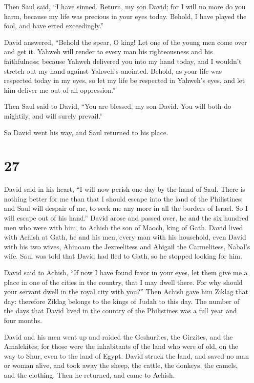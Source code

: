  Then Saul said, ``I have sinned. Return, my son David; for
I will no more do you harm, because my life was precious in your eyes
today. Behold, I have played the fool, and have erred exceedingly.''

 David answered, ``Behold the spear, O king! Let one of the
young men come over and get it.  Yahweh will render to
every man his righteousness and his faithfulness; because Yahweh
delivered you into my hand today, and I wouldn't stretch out my hand
against Yahweh's anointed.  Behold, as your life was
respected today in my eyes, so let my life be respected in Yahweh's
eyes, and let him deliver me out of all oppression.''

 Then Saul said to David, ``You are blessed, my son David.
You will both do mightily, and will surely prevail.''

So David went his way, and Saul returned to his place.

\hypertarget{section-26}{%
\section{27}\label{section-26}}

 David said in his heart, ``I will now perish one day by the
hand of Saul. There is nothing better for me than that I should escape
into the land of the Philistines; and Saul will despair of me, to seek
me any more in all the borders of Israel. So I will escape out of his
hand.''  David arose and passed over, he and the six hundred
men who were with him, to Achish the son of Maoch, king of Gath.
 David lived with Achish at Gath, he and his men, every man
with his household, even David with his two wives, Ahinoam the
Jezreelitess and Abigail the Carmelitess, Nabal's wife. 
Saul was told that David had fled to Gath, so he stopped looking for
him.

 David said to Achish, ``If now I have found favor in your
eyes, let them give me a place in one of the cities in the country, that
I may dwell there. For why should your servant dwell in the royal city
with you?''  Then Achish gave him Ziklag that day: therefore
Ziklag belongs to the kings of Judah to this day.  The
number of the days that David lived in the country of the Philistines
was a full year and four months.

 David and his men went up and raided the Geshurites, the
Girzites, and the Amalekites; for those were the inhabitants of the land
who were of old, on the way to Shur, even to the land of Egypt.
 David struck the land, and saved no man or woman alive, and
took away the sheep, the cattle, the donkeys, the camels, and the
clothing. Then he returned, and came to Achish.

